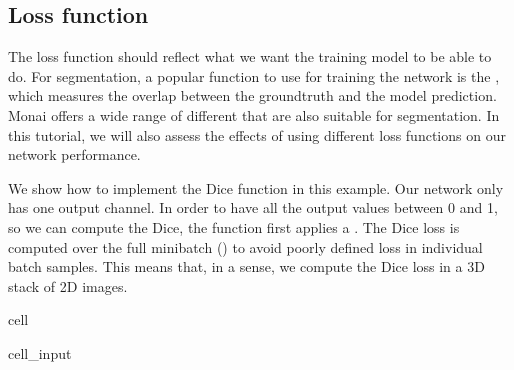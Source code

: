 \documentclass[letterpaper,10pt,english]{jupyterBook}
\begin{document}
\subsection{Loss function}
\label{\detokenize{notebooks/Tutorial3_Segmentation/Tutorial3_Segmentation_student:loss-function}}
\sphinxAtStartPar
The loss function should reflect what we want the training model to be able to do.
For segmentation, a popular function to use for training the network is the , which measures the overlap between the ground\sphinxhyphen{}truth and the model prediction. Monai offers a wide range of different  that are also suitable for segmentation. In this tutorial, we will also assess the effects of using different loss functions on our network performance.

\sphinxAtStartPar
We show how to implement the Dice function in this example. Our network only has one output channel. In order to have all the output values between 0 and 1, so we can compute the Dice, the function first applies a . The Dice loss is computed over the full mini\sphinxhyphen{}batch () to avoid poorly defined loss in individual batch samples. This means that, in a sense, we compute the Dice loss in a 3D stack of 2D images.

\begin{sphinxuseclass}{cell}\begin{sphinxVerbatimInput}

\begin{sphinxuseclass}{cell_input}
\begin{sphinxVerbatim}[commandchars=\\\{\}]
    
\end{sphinxVerbatim}

\end{sphinxuseclass}\end{sphinxVerbatimInput}

\end{sphinxuseclass}
\end{document}
